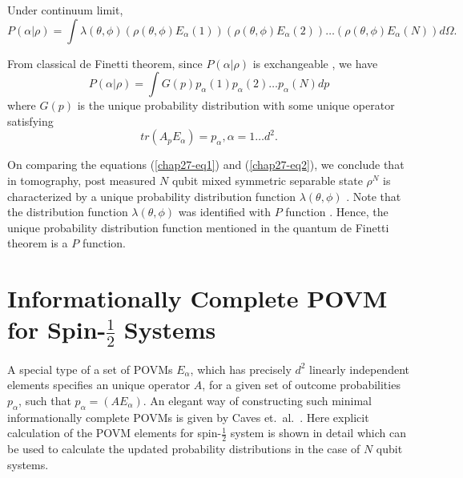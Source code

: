 Under continuum limit,
\makeatletter
{}
\makeatother
\begin{equation} 
P(\alpha|\rho) = \int \lambda(\theta,\phi) (\rho(\theta,\phi) E_{\alpha}(1)) (\rho (\theta,\phi) E_{\alpha}(2)) \ldots (\rho (\theta,\phi) E_{\alpha}(N)) d\Omega. \label{chap27-eq1}
\end{equation}

From classical de Finetti theorem, since $P(\alpha|\rho)$ is exchangeable \cite{chap27-key10}, we have 
\begin{equation} 
P(\alpha|\rho) = \int G(p) p_{\alpha}(1) p_{\alpha}(2) \ldots p_{\alpha}(N) dp \label{chap27-eq2}
\end{equation} 
where $G(p)$ is the unique probability distribution with some unique operator satisfying 
$$
tr(A_{p}E_{\alpha}) = p_{\alpha}, \alpha= 1 \ldots d^{2}.
$$

On comparing the equations (\eqref{chap27-eq1}) and (\eqref{chap27-eq2}), we conclude that in tomography, post measured $N$ qubit mixed symmetric separable state $\rho^{N}$ is characterized by a unique probability distribution function $\lambda(\theta,\phi)$ \cite{chap27-key11}. Note that the distribution function $\lambda(\theta,\phi)$ was identified with $P$ function \cite{chap27-key12}. Hence, the unique probability distribution function mentioned in the quantum de Finetti theorem is a $P$ function.

\section{Informationally Complete POVM for Spin-$\frac{1}{2}$ Systems}\label{chap27-sec6}

A special type of a set of POVMs \cite{chap27-key8} $E_{\alpha}$, which has precisely $d^{2}$ linearly independent elements specifies an unique operator $A$, for a given set of outcome probabilities $p_{\alpha}$, such that $p_{\alpha}= (AE_{\alpha})$. An elegant way of constructing such minimal informationally complete POVMs is given by Caves et.\ al.\ \cite{chap27-key8}. Here explicit calculation of the POVM elements for spin-$\frac{1}{2}$ system is shown in detail which can be used to calculate the updated probability distributions in the case of $N$ qubit systems.

